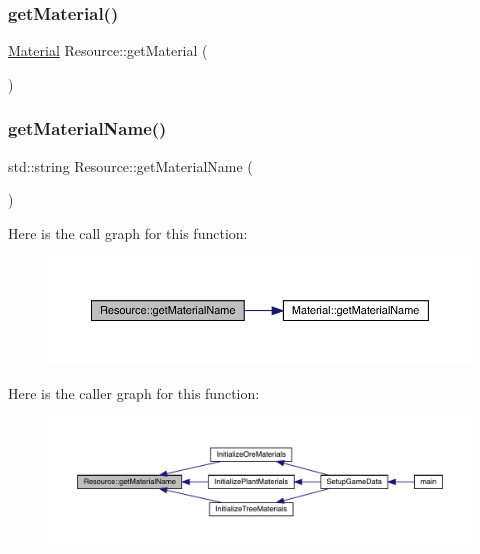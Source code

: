 \mbox{\label{class_resource_a931df727dee149b73f9e10e228e7807a}} 
\subsubsection{\texorpdfstring{get\+Material()}{getMaterial()}}
{\footnotesize\ttfamily \mbox{\hyperlink{class_material}{Material}} Resource\+::get\+Material (\begin{DoxyParamCaption}{ }\end{DoxyParamCaption})}

\mbox{\label{class_resource_acdeb90b10c0e8b2837997525468ab5c3}} 
\subsubsection{\texorpdfstring{get\+Material\+Name()}{getMaterialName()}}
{\footnotesize\ttfamily std\+::string Resource\+::get\+Material\+Name (\begin{DoxyParamCaption}{ }\end{DoxyParamCaption})}

Here is the call graph for this function\+:
\nopagebreak
\begin{figure}[H]
\begin{center}
\leavevmode
\includegraphics[width=350pt]{class_resource_acdeb90b10c0e8b2837997525468ab5c3_cgraph}
\end{center}
\end{figure}
Here is the caller graph for this function\+:
\nopagebreak
\begin{figure}[H]
\begin{center}
\leavevmode
\includegraphics[width=350pt]{class_resource_acdeb90b10c0e8b2837997525468ab5c3_icgraph}
\end{center}
\end{figure}
\mbox{\label{class_resource_af16ad4255d82bea0bfa2c9ff2faeb596}} 
